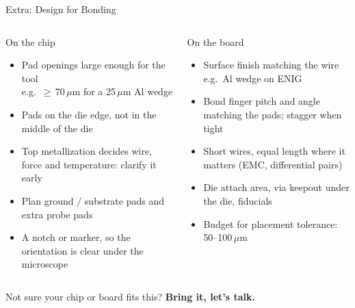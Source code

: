 \documentclass[aspectratio=169,11pt]{beamer}
\begin{document}
\begin{frame}{Extra: Design for Bonding}
  \footnotesize
  \begin{columns}[T]
      \begin{block}{On the chip}
        \begin{itemize}\setlength\itemsep{0.2em}
          \item Pad openings large enough for the tool\\
                {\scriptsize\color{cobgrey} e.g.\ $\geq$\,70\,$\mu$m for a 25\,$\mu$m Al wedge}
          \item Pads on the die edge, not in the middle of the die
          \item Top metallization decides wire, force and temperature: clarify it early
          \item Plan ground / substrate pads and extra probe pads
          \item A notch or marker, so the orientation is clear under the microscope
        \end{itemize}
      \end{block}
      \begin{block}{On the board}
        \begin{itemize}\setlength\itemsep{0.2em}
          \item Surface finish matching the wire\\
                {\scriptsize\color{cobgrey} e.g.\ Al wedge on ENIG}
          \item Bond finger pitch and angle matching the pads; stagger when tight
          \item Short wires, equal length where it matters (EMC, differential pairs)
          \item Die attach area, via keepout under the die, fiducials
          \item Budget for placement tolerance: 50--100\,$\mu$m
        \end{itemize}
      \end{block}
  \end{columns}
  \vfill
  \begin{center}
    \small Not sure your chip or board fits this? \textbf{Bring it, let's talk.}
  \end{center}
\end{frame}
\end{document}
